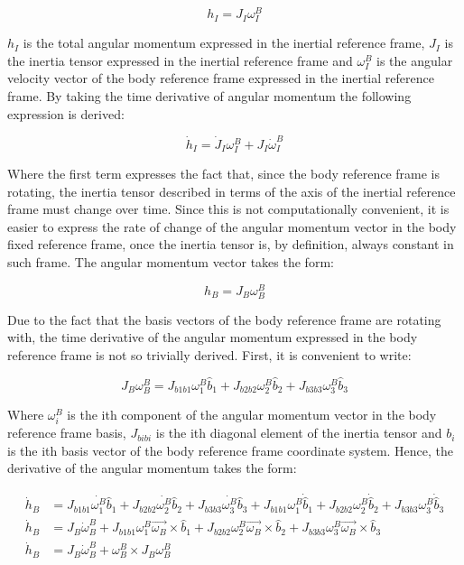 \begin{equation}
	h_{I} = J_{I}\omega^{B}_{I}
\end{equation}

\indent
	$h_{I}$ is the total angular momentum expressed in the inertial reference frame, $J_{I}$ is the inertia tensor expressed in the inertial reference frame and $\omega^B_I$ is the angular velocity vector of the body reference frame expressed in the inertial reference frame. By taking the time derivative of angular momentum the following expression is derived:

\begin{equation}
	\dot{h}_{I} = \dot{J}_{I}\omega^{B}_{I} + J_{I}\dot{\omega}^{B}_{I}
\end{equation}

\indent
	Where the first term expresses the fact that, since the body reference frame is rotating, the inertia tensor described in terms of the axis of the inertial reference frame must change over time. Since this is not computationally convenient, it is easier to express the rate of change of the angular momentum vector in the body fixed reference frame, once the inertia tensor is, by definition, always constant in such frame. The angular momentum vector takes the form:

\begin{equation}
	h_{B} = J_{B}\omega^{B}_{B}
\end{equation}

\indent
	Due to the fact that the basis vectors of the body reference frame are rotating with, the time derivative of the angular momentum expressed in the body reference frame is not so trivially derived. First, it is convenient to write:

\begin{equation}
	J_{B}\omega^{B}_{B} = J_{b1b1}\omega^{B}_1\hat{b}_1 + J_{b2b2}\omega^{B}_2\hat{b}_2  + J_{b3b3}\omega^{B}_3\hat{b}_3 
\end{equation}

\indent
	Where $\omega^{B}_i$ is the ith component of the angular momentum vector in the body reference frame basis, $J_{bibi}$ is the ith diagonal element of the inertia tensor and $b_i$ is the ith basis vector of the body reference frame coordinate system. Hence, the derivative of the angular momentum takes the form:

\begin{align}
	\dot{h}_{B} &= J_{b1b1}\dot{\omega^{B}_1}\hat{b}_1 + J_{b2b2}\dot{\omega^{B}_2}\hat{b}_2  + J_{b3b3}\dot{\omega^{B}_3}\hat{b}_3 +  J_{b1b1}\omega^{B}_1\dot{\hat{b}}_1 + J_{b2b2}\omega^{B}_2\dot{\hat{b}}_2  + J_{b3b3}\omega^{B}_3\dot{\hat{b}}_3 \\
	\dot{h}_{B} &= J_{B}\dot{\omega}^{B}_{B} + J_{b1b1}\omega^{B}_1 \vec{\omega_{B}} \times \hat{b}_1 + J_{b2b2}\omega^{B}_2 \vec{\omega_{B}} \times \hat{b}_2  + J_{b3b3}\omega^{B}_3 \vec{\omega_{B}} \times \hat{b}_3 \\
	\dot{h}_{B} &=  J_{B}\dot{\omega}^{B}_{B} + \omega^{B}_{B} \times J_{B} \omega^{B}_{B}
\end{align}

